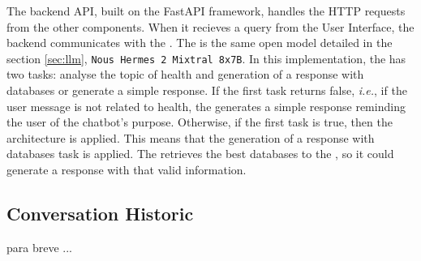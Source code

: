 The backend API, built on the FastAPI framework, handles the HTTP requests from the other components. When it recieves a query from the User Interface, the backend communicates with the {\llm}. The {\llm} is the same open model detailed in the section \ref{sec:llm}, \texttt{Nous Hermes 2 Mixtral 8x7B}. In this implementation, the {\llm} has two tasks: analyse the topic of health and generation of a response with databases or generate a simple response. If the first task returns false, \textit{i.e.}, if the user message is not related to health, the {\llm} generates a simple response reminding the user of the chatbot's purpose. Otherwise, if the first task is true, then the {\rag} architecture is applied. This means that the generation of a response with databases task is applied. The {\bm} retrieves the best databases to the {\llm}, so it could generate a response with that valid information.


\subsection{Conversation Historic}

para breve ...